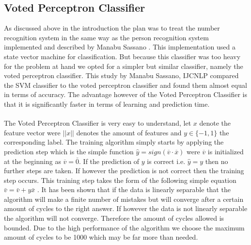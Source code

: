 \documentclass[%
        compressed,
        final,
        notitlepage,
        narroweqnarray,
        inline,
        twoside,
        ]{ieee}
\begin{document}
\subsection{Voted Perceptron Classifier}
As discussed above in the introduction the plan was to treat the number
recognition system in the same way as the person recognition system implemented
and described by Manabu Sassano \cite{Manabu}.
This implementation used a state vector machine for classification. But because
this classifier was too heavy for the problem at hand we opted for a simpler but
similar classifier, namely the voted perceptron classifier. This study by Manabu
Sassano, IJCNLP compared the SVM classifier to the voted perceptron classifier
and found them almost equal in terms of accuracy. The advantage however of the
Voted Perceptron Classifier is that it is significantly faster in terms of learning
and prediction time.\\\\
The Voted Perceptron Classifier is very easy to understand, let $x$ denote the
feature vector were $||x||$ denotes the amount of features and $y \in \{-1,1\}$
the corresponding label. The training algorithm simply starts by applying the
prediction step which is the simple function $\hat{y} =
sign(\overline{v}\cdot\overline{x})$ were $\overline{v}$ is
initialized at the beginning as $\overline{v}=\bar{0}$. If the prediction of $y$ is correct i.e.
$\hat{y}=y$
then no further steps are taken. If however the prediction is not correct then
the training step occurs. This training step takes the form of the following
simple equation $\bar{v}=\bar{v}+y\bar{x}$ . It has been shown that if the data is linearly separable that
the algorithm will make a finite number of mistakes but will converge after a
certain amount of cycles to the right answer. If however the data is not
linearly separable the algorithm will not converge. Therefore the amount of
cycles allowed is bounded. Due to the high performance of the algorithm we
choose the maximum amount of cycles to be 1000 which may be far more than
needed.

\end{document}
